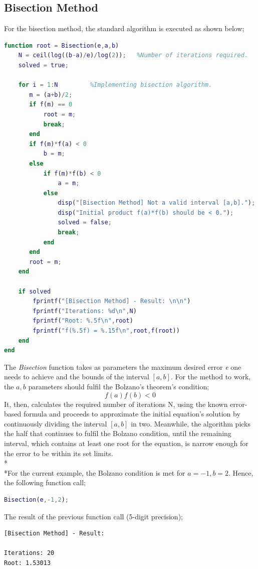 \documentclass{article}
\begin{document}
\subsection{Bisection Method}
For the bisection method, the standard algorithm is executed as shown below;
\begin{lstlisting}[language=Matlab]
function root = Bisection(e,a,b)
    N = ceil(log((b-a)/e)/log(2));   %Number of iterations required.
    solved = true;

    for i = 1:N         %Implementing bisection algorithm.
       m = (a+b)/2;
       if f(m) == 0
           root = m;
           break;
       end
       if f(m)*f(a) < 0
           b = m;
       else
           if f(m)*f(b) < 0
               a = m;
           else
               disp("[Bisection Method] Not a valid interval [a,b]."); 
               disp("Initial product f(a)*f(b) should be < 0.");
               solved = false;
               break;
           end
       end
       root = m;
    end
    
    if solved
        fprintf("[Bisection Method] - Result: \n\n")   
        fprintf("Iterations: %d\n",N)                
        fprintf("Root: %.5f\n",root)                 
        fprintf("f(%.5f) = %.15f\n",root,f(root)) 
    end
end
\end{lstlisting}
The \emph{Bisection} function takes as parameters the maximum desired error \emph{e} one needs to achieve and the bounds of the interval $[a,b]$. For the method to work, the $a,b$ parameters should fulfil the Bolzano's theorem's condition; \[f(a)f(b)<0\]It, then, calculates the required number of iterations N, using the known error-based formula and proceeds to approximate the initial equation's solution by continuously dividing the interval $[a,b]$ in two. Meanwhile, the algorithm picks the half that continues to fulfil the Bolzano condition, until the remaining interval, which contains at least one root for the equation, is narrow enough for the error to be within its set limits.\\*\\*For the current example, the Bolzano condition is met for $a = -1, b = 2$. Hence, the following function call;
\begin{lstlisting}[language=Matlab]
Bisection(e,-1,2);
\end{lstlisting}
The result of the previous function call (5-digit precision);
\begin{lstlisting}
[Bisection Method] - Result: 

Iterations: 20
Root: 1.53013
\end{lstlisting}
\pagebreak
\end{document}
